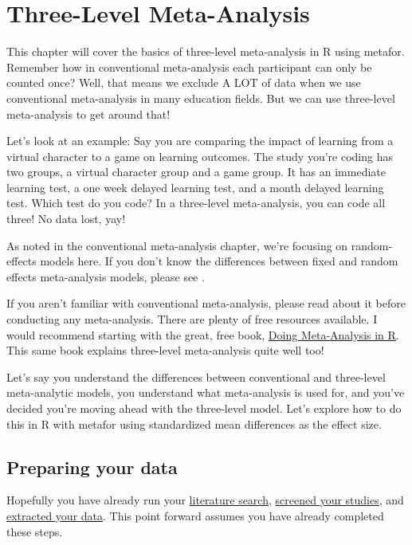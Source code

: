 \documentclass[
]{book}
\begin{document}
\hypertarget{3LMA}{%
\chapter{Three-Level Meta-Analysis}\label{3LMA}}

This chapter will cover the basics of three-level meta-analysis in R using metafor\citep{viechtbauer2010}. Remember how in conventional meta-analysis each participant can only be counted once? Well, that means we exclude A LOT of data when we use conventional meta-analysis in many education fields. But we can use three-level meta-analysis to get around that!

Let's look at an example: Say you are comparing the impact of learning from a virtual character to a game on learning outcomes. The study you're coding has two groups, a virtual character group and a game group. It has an immediate learning test, a one week delayed learning test, and a month delayed learning test. Which test do you code? In a three-level meta-analysis, you can code all three! No data lost, yay!

As noted in the conventional meta-analysis chapter, we're focusing on random-effects models here. If you don't know the differences between fixed and random effects meta-analysis models, please see \citep{borenstein2010}.

If you aren't familiar with conventional meta-analysis, please read about it before conducting any meta-analysis. There are plenty of free resources available. I would recommend starting with the great, free book, \href{https://bookdown.org/MathiasHarrer/Doing_Meta_Analysis_in_R/}{Doing Meta-Analysis in R}\citep{harrer2021}. This same book explains three-level meta-analysis quite well too!

Let's say you understand the differences between conventional and three-level meta-analytic models, you understand what meta-analysis is used for, and you've decided you're moving ahead with the three-level model. Let's explore how to do this in R with metafor using standardized mean differences as the effect size.

\hypertarget{preparing-your-data-1}{%
\section{Preparing your data}\label{preparing-your-data-1}}

Hopefully you have already run your \protect\hyperlink{crossliteraturesearch}{literature search}, \protect\hyperlink{crossscreening}{screened your studies}, and \protect\hyperlink{crossdata}{extracted your data}. This point forward assumes you have already completed these steps.
\end{document}
